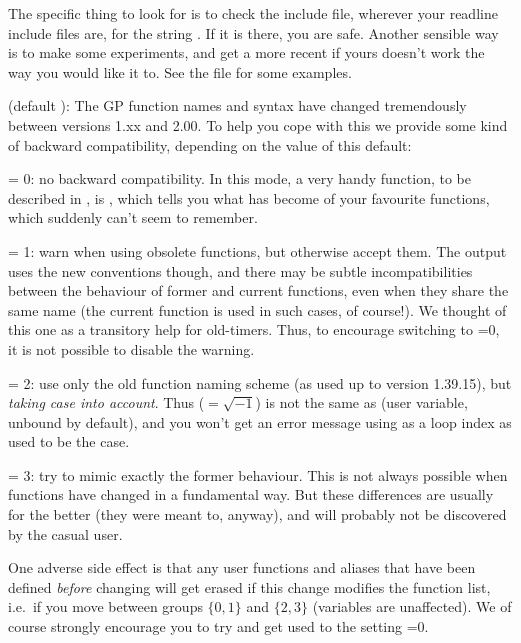 The specific thing to look for is to check the  include
file, wherever your readline include files are, for the string
. If it is there, you are safe. Another
sensible way is to make some experiments, and get a more recent
 if yours doesn't work the way you would like it to. See
the file  for some examples.

 (default ): The GP function names and syntax
have changed tremendously between versions 1.xx and 2.00. To help you cope
with this we provide some kind of backward compatibility, depending on the
value of this default:

\quad {} = 0: no backward compatibility. In this mode, a very
handy function, to be described in , is ,
which tells you what has become of your favourite functions, which 
suddenly can't seem to remember.

\quad {} = 1: warn when using obsolete functions, but
otherwise accept them. The output uses the new conventions though, and
there may be subtle incompatibilities between the behaviour of former and
current functions, even when they share the same name (the current function
is used in such cases, of course!). We thought of this one as a transitory
help for  old-timers. Thus, to encourage switching to =0,
it is not possible to disable the warning.

\quad {} = 2: use only the old function naming scheme (as
used up to version 1.39.15), but \emph{taking case into account}. Thus
 (${}=\sqrt{-1}$) is not the same as  (user variable, unbound
by default), and you won't get an error message using  as a loop
index as used to be the case.

\quad {} = 3: try to mimic exactly the former behaviour. This
is not always possible when functions have changed in a fundamental way.
But these differences are usually for the better (they were meant to,
anyway), and will probably not be discovered by the casual user.

One adverse side effect is that any user functions and aliases that have
been defined \emph{before} changing  will get erased if this
change modifies the function list, i.e.~if you move between groups
$\{0,1\}$ and $\{2,3\}$ (variables are unaffected). We of course strongly
encourage you to try and get used to the setting =0.

